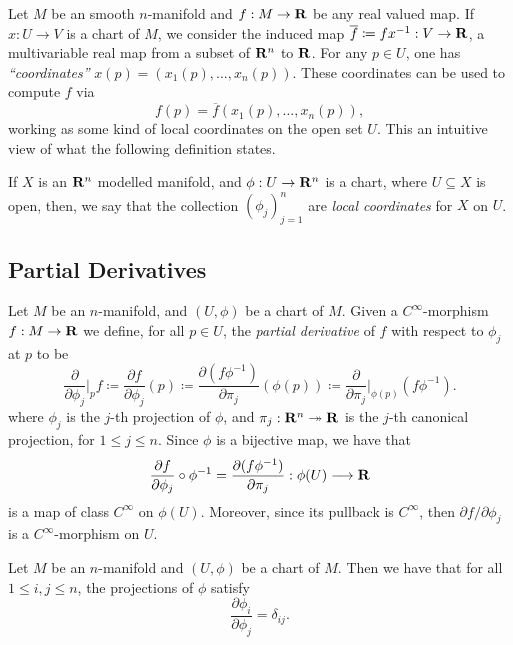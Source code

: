 Let \(M\) be an smooth \(n\)-manifold and \(f: M \to \mathbf{R}\) be any real valued
map. If \(x: U \to V\) is a chart of \(M\), we consider the induced map
\(\overline{f} \coloneq f x^{-1}: V \to \mathbf{R}\), a multivariable real map from a
subset of \(\mathbf{R}^n\) to \(\mathbf{R}\). For any \(p \in U\), one has
\emph{``coordinates''} \(x(p) = (x_1(p), \dots, x_n(p))\). These coordinates can
be used to compute \(f\) via
\[
f(p) = \overline{f}(x_1(p), \dots, x_n(p)),
\]
working as some kind of local coordinates on the open set \(U\). This an
intuitive view of what the following definition states.

\begin{definition}
\label{def:local-coordinates}
If \(X\) is an \(\mathbf{R}^n\) modelled manifold, and \(\phi: U \to \mathbf{R}^n\) is a chart,
where \(U \subseteq X\) is open, then, we say that the collection
\((\phi_j)_{j=1}^n\) are \emph{local coordinates} for \(X\) on \(U\).
\end{definition}

\subsection{Partial Derivatives}

\begin{definition}
\label{def:partial-derivative-manifold}
Let \(M\) be an \(n\)-manifold, and \((U, \phi)\) be a chart of \(M\). Given a
\(C^{\infty}\)-morphism \(f: M \to \mathbf{R}\) we define, for all \(p \in U\), the
\emph{partial derivative} of \(f\) with respect to \(\phi_j\) at \(p\) to be
\[
\frac{\partial}{\partial \phi_j} \bigg|_p f
\coloneq \frac{\partial f}{\partial \phi_j}(p)
\coloneq \frac{\partial (f \phi^{-1})}{\partial \pi_j}(\phi(p))
\coloneq \frac{\partial}{\partial \pi_{j}} \bigg|_{\phi(p)} (f \phi^{-1}).
\]
where \(\phi_j\) is the \(j\)-th projection of \(\phi\), and
\(\pi_j: \mathbf{R}^n \twoheadrightarrow \mathbf{R}\) is the \(j\)-th canonical projection, for
\(1 \leq j \leq n\). Since \(\phi\) is a bijective map, we have that
\[
\frac{\partial f}{\partial \phi_j} \circ \phi^{-1}
= \frac{\partial (f \phi^{-1})}{\partial \pi_j}:
\phi(U) \longrightarrow \mathbf{R}
\]
is a map of class \(C^{\infty}\) on \(\phi(U)\). Moreover, since its pullback is
\(C^{\infty}\), then \(\partial f/\partial \phi_j\) is a \(C^{\infty}\)-morphism on \(U\).
\end{definition}

\begin{proposition}
\label{prop:partial-derivative-distinct-projections}
Let \(M\) be an \(n\)-manifold and \((U, \phi)\) be a chart of \(M\). Then we
have that for all \(1 \leq i, j \leq n\), the projections of \(\phi\) satisfy
\[
\frac{\partial \phi_i}{\partial \phi_j} = \delta_{i j}.
\]
\end{proposition}


